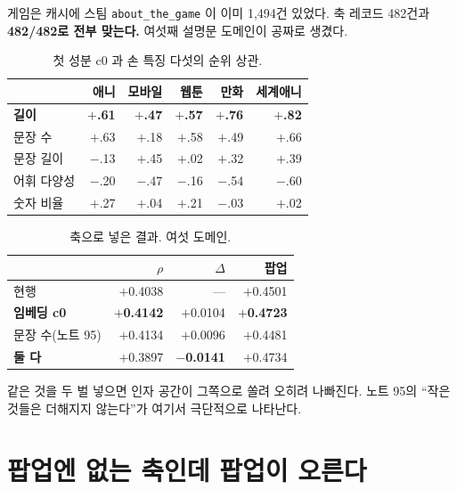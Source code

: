 \documentclass[10pt]{article}
\begin{document}
게임은 캐시에 스팀 \texttt{about\_the\_game} 이 이미 1,494건 있었다. 축
레코드 482건과 \textbf{482/482로 전부 맞는다.} 여섯째 설명문 도메인이 공짜로
생겼다.

\begin{table}[t]
\centering\tsize
\caption{첫 성분 c0 과 손 특징 다섯의 순위 상관.}
\begin{tabular}{lrrrrr}
\toprule
& 애니 & 모바일 & 웹툰 & 만화 & 세계애니 \\
\midrule
\textbf{길이} & \textbf{$+$.61} & \textbf{$+$.47} & \textbf{$+$.57} &
\textbf{$+$.76} & \textbf{$+$.82} \\
문장 수 & $+$.63 & $+$.18 & $+$.58 & $+$.49 & $+$.66 \\
문장 길이 & $-$.13 & $+$.45 & $+$.02 & $+$.32 & $+$.39 \\
어휘 다양성 & $-$.20 & $-$.47 & $-$.16 & $-$.54 & $-$.60 \\
숫자 비율 & $+$.27 & $+$.04 & $+$.21 & $-$.03 & $+$.02 \\
\bottomrule
\end{tabular}
\end{table}


\begin{table}[t]
\centering\tsize
\caption{축으로 넣은 결과. 여섯 도메인.}
\begin{tabular}{lrrr}
\toprule
& $\rho$ & $\Delta$ & 팝업 \\
\midrule
현행 & $+$0.4038 & --- & $+$0.4501 \\
\textbf{임베딩 c0} & \textbf{$+$0.4142} & $+$0.0104 & \textbf{$+$0.4723} \\
문장 수(노트 95) & $+$0.4134 & $+$0.0096 & $+$0.4481 \\
\textbf{둘 다} & $+$0.3897 & \textbf{$-$0.0141} & $+$0.4734 \\
\bottomrule
\end{tabular}
\end{table}

같은 것을 두 벌 넣으면 인자 공간이 그쪽으로 쏠려 오히려 나빠진다. 노트 95의
``작은 것들은 더해지지 않는다''가 여기서 극단적으로 나타난다.

\section{팝업엔 없는 축인데 팝업이 오른다}
\end{document}
